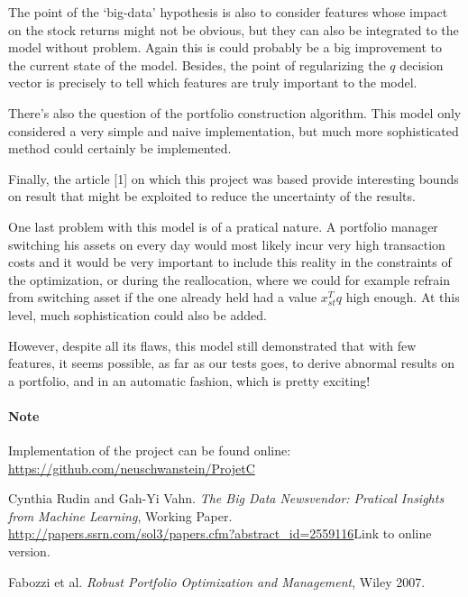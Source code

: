 \documentclass[11pt,fleqn]{article}
\begin{document}
The point of the `big-data' hypothesis is also to consider features whose impact on the
stock returns might not be obvious, but they can also be integrated to the model without
problem. Again this is could probably be a big improvement to the current state of the
model. Besides, the point of regularizing the $q$ decision vector is precisely to tell
which features are truly important to the model. 

There's also the question of the portfolio construction algorithm. This model only
considered a very simple and naive implementation, but much more sophisticated method
could certainly be implemented. 

Finally, the article [1] on which this project was based provide interesting bounds on
result that might be exploited to reduce the uncertainty of the results.

One last problem with this model is of a pratical nature. A portfolio manager switching
his assets on every day would most likely incur very high transaction costs and it would
be very important to include this reality in the constraints of the optimization, or
during the reallocation, where we could for example refrain from switching asset if the
one already held had a value $x_{st}^Tq$ high enough. At this level, much sophistication
could also be added.

However, despite all its flaws, this model still demonstrated that with few features, it
seems possible, as far as our tests goes, to derive abnormal results on a portfolio, and
in an automatic fashion, which is pretty exciting! 

\paragraph{Note}

Implementation of the project can be found online: \url{https://github.com/neuschwanstein/ProjetC}


\begin{thebibliography}{9}
  
  Cynthia Rudin and Gah-Yi Vahn. \emph{The Big Data Newsvendor: Pratical
    Insights from Machine Learning}, Working
  Paper. \url{http://papers.ssrn.com/sol3/papers.cfm?abstract_id=2559116}{\textsf{Link to
      online version}}.

 Fabozzi et al. \emph{Robust Portfolio Optimization and Management}, Wiley 2007.
\end{thebibliography}
\end{document}
